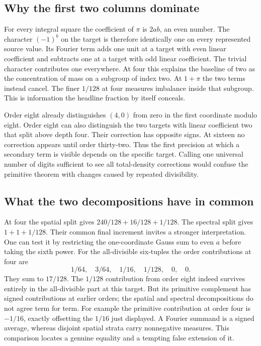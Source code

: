 \documentclass[12pt,letterpaper]{article}
\begin{document}
\subsection{Why the first two columns dominate}
For every integral square the coefficient of $\pi$ is $2ab$, an even number. The character $(-1)^b$ on the target is therefore identically one on every represented source value. Its Fourier term adds one unit at a target with even linear coefficient and subtracts one at a target with odd linear coefficient. The trivial character contributes one everywhere. At four this explains the baseline of two as the concentration of mass on a subgroup of index two. At $1+\pi$ the two terms instead cancel. The finer $1/128$ at four measures imbalance inside that subgroup. This is information the headline fraction by itself conceals.
\par
Order eight already distinguishes $(4,0)$ from zero in the first coordinate modulo eight. Order eight can also distinguish the two targets with linear coefficient two that split above depth four. Their correction has opposite signs. At sixteen no correction appears until order thirty-two. Thus the first precision at which a secondary term is visible depends on the specific target. Calling one universal number of digits sufficient to see all total-density corrections would confuse the primitive theorem with changes caused by repeated divisibility.
\subsection{What the two decompositions have in common}
At four the spatial split gives $240/128+16/128+1/128$. The spectral split gives $1+1+1/128$. Their common final increment invites a stronger interpretation. One can test it by restricting the one-coordinate Gauss sum to even $a$ before taking the sixth power. For the all-divisible six-tuples the order contributions at four are
\[
 1/64,\quad 3/64,\quad 1/16,\quad 1/128,\quad0,\quad0 .
\]
They sum to $17/128$. The $1/128$ contribution from order eight indeed survives entirely in the all-divisible part at this target. But its primitive complement has signed contributions at earlier orders; the spatial and spectral decompositions do not agree term for term. For example the primitive contribution at order four is $-1/16$, exactly offsetting the $1/16$ just displayed. A Fourier summand is a signed average, whereas disjoint spatial strata carry nonnegative measures. This comparison locates a genuine equality and a tempting false extension of it.
\end{document}
